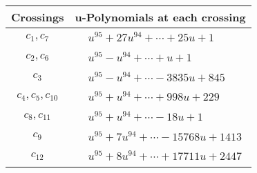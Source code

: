 \documentclass[1p]{elsarticle_modified}
\theoremstyle{definition}
\begin{document}
\begin{tabular}{m{50pt}|m{274pt}}
Crossings & \hspace{64pt}u-Polynomials at each crossing \\
\hline $$\begin{aligned}c_{1},c_{7}\end{aligned}$$&$\begin{aligned}
&u^{95}+27 u^{94}+\cdots+25 u+1
\end{aligned}$\\
\hline $$\begin{aligned}c_{2},c_{6}\end{aligned}$$&$\begin{aligned}
&u^{95}- u^{94}+\cdots+u+1
\end{aligned}$\\
\hline $$\begin{aligned}c_{3}\end{aligned}$$&$\begin{aligned}
&u^{95}- u^{94}+\cdots-3835 u+845
\end{aligned}$\\
\hline $$\begin{aligned}c_{4},c_{5},c_{10}\end{aligned}$$&$\begin{aligned}
&u^{95}+u^{94}+\cdots+998 u+229
\end{aligned}$\\
\hline $$\begin{aligned}c_{8},c_{11}\end{aligned}$$&$\begin{aligned}
&u^{95}+u^{94}+\cdots-18 u+1
\end{aligned}$\\
\hline $$\begin{aligned}c_{9}\end{aligned}$$&$\begin{aligned}
&u^{95}+7 u^{94}+\cdots-15768 u+1413
\end{aligned}$\\
\hline $$\begin{aligned}c_{12}\end{aligned}$$&$\begin{aligned}
&u^{95}+8 u^{94}+\cdots+17711 u+2447
\end{aligned}$\\
\hline
\end{tabular}\\~\\
\newpage\renewcommand{\arraystretch}{1}
\end{document}
